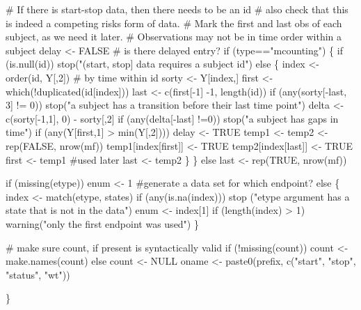 \documentclass{article}
\begin{document}
\begin{nwchunk}
     # If there is start-stop data, then there needs to be an id
     #  also check that this is indeed a competing risks form of data.
     # Mark the first and last obs of each subject, as we need it later.
     #  Observations may not be in time order within a subject
     delay <- FALSE  # is there delayed entry?
     if (type=="mcounting") \{
         if (is.null(id)) stop("(start, stop] data requires a subject id")
         else \{
             index <- order(id, Y[,2]) # by time within id
             sorty <- Y[index,]
             first <- which(!duplicated(id[index]))
             last  <- c(first[-1] -1, length(id))
             if (any(sorty[-last, 3] != 0))
                 stop("a subject has a transition before their last time point")
             delta <- c(sorty[-1,1], 0) - sorty[,2]
             if (any(delta[-last] !=0)) 
                 stop("a subject has gaps in time")
             if (any(Y[first,1] > min(Y[,2]))) delay <- TRUE
             temp1 <- temp2 <- rep(FALSE, nrow(mf))
             temp1[index[first]] <- TRUE
             temp2[index[last]]  <- TRUE
             first <- temp1  #used later
             last <-  temp2
          \}
     \} else last <- rep(TRUE, nrow(mf))  
 
     if (missing(etype)) enum <- 1  #generate a data set for which endpoint?
     else \{
         index <- match(etype, states)
         if (any(is.na(index)))
             stop ("etype argument has a state that is not in the data")
         enum <- index[1]
         if (length(index) > 1) warning("only the first endpoint was used")
     \}
     
     # make sure count, if present is syntactically valid
     if (!missing(count)) count <- make.names(count) else count <- NULL
     oname <- paste0(prefix, c("start", "stop", "status", "wt"))
         
 \}  
\end{nwchunk}
\end{document}
